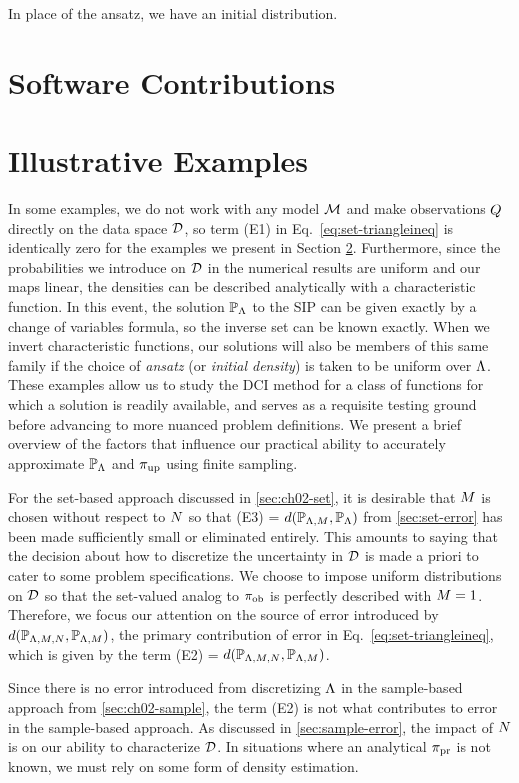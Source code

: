 In place of the ansatz, we have an initial distribution.



\section{Software Contributions}\label{sec:ch02-software}



\section{Illustrative Examples}\label{sec:ch02-examples}
In some examples, we do not work with any model $\mathcal{M}$ and make observations $Q$ directly on the data space $\mathcal{D}$, so term (E1) in Eq.~\eqref{eq:set-triangleineq} is identically zero for the examples we present in Section \ref{sec:ch02-examples}.
Furthermore, since the probabilities we introduce on $\mathcal{D}$ in the numerical results are uniform and our maps linear, the densities can be described analytically with a characteristic function.
In this event, the solution $\operatorname*{\mathbb{P}_{{\Lambda}}}$ to the SIP can be given exactly by a change of variables formula, so the inverse set can be known exactly.
When we invert characteristic functions, our solutions will also be members of this same family if the choice of \emph{ansatz} (or \emph{initial density}) is taken to be uniform over ${\Lambda}$.
These examples allow us to study the DCI method for a class of functions for which a solution is readily available, and serves as a requisite testing ground before advancing to more nuanced problem definitions.
We present a brief overview of the factors that influence our practical ability to accurately approximate $\operatorname*{\mathbb{P}_{{\Lambda}}}$ and $\operatorname*{\pi_{up}}$ using finite sampling.

For the set-based approach discussed in \ref{sec:ch02-set}, it is desirable that $M$ is chosen without respect to $N$ so that (E3) = $d(\mathbb{P}_{{\Lambda}, M}, \operatorname*{\mathbb{P}_{{\Lambda}}})$ from \ref{sec:set-error} has been made sufficiently small or eliminated entirely.
This amounts to saying that the decision about how to discretize the uncertainty in $\mathcal{D}$ is made a priori to cater to some problem specifications.
We choose to impose uniform distributions on $\mathcal{D}$ so that the set-valued analog to $\operatorname*{\pi_{ob}}$ is perfectly described with $M=1$.
Therefore, we focus our attention on the source of error introduced by $d(\mathbb{P}_{{\Lambda}, M, N}, \mathbb{P}_{{\Lambda}, M} )$, the primary contribution of error in Eq.~\eqref{eq:set-triangleineq}, which is given by the term (E2) = $d(\mathbb{P}_{{\Lambda}, M, N}, \mathbb{P}_{{\Lambda}, M})$.

Since there is no error introduced from discretizing ${\Lambda}$ in the sample-based approach from \ref{sec:ch02-sample}, the term (E2) is not what contributes to error in the sample-based approach.
As discussed in \ref{sec:sample-error}, the impact of $N$ is on our ability to characterize $\mathcal{D}$.
In situations where an analytical $\operatorname*{\pi_{pr}}$ is not known, we must rely on some form of density estimation.





